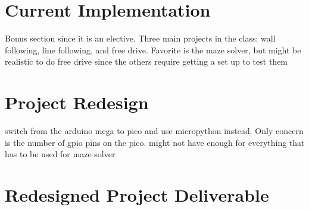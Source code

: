 \section{Current Implementation}
Bonus section since it is an elective. Three main projects in the 
class: wall following, line following, and free drive. Favorite is 
the maze solver, but might be realistic to do free drive since the 
others require getting a set up to test them

\section{Project Redesign}
switch from the arduino mega to pico and use micropython instead. 
Only concern is the number of gpio pins on the pico. might not have 
enough for everything that has to be used for maze solver

\section{Redesigned Project Deliverable}
